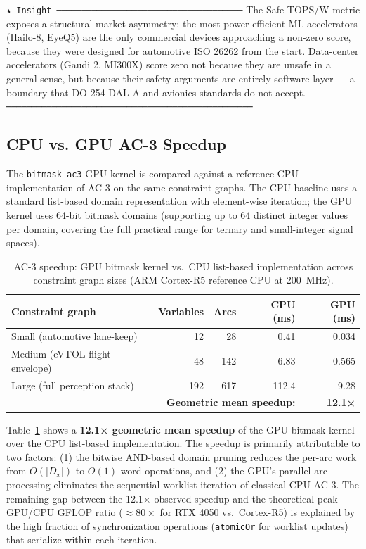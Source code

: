 \documentclass[conference]{IEEEtran}
\begin{document}
\texttt{★ Insight ─────────────────────────────────────}
The Safe-TOPS/W metric exposes a structural market asymmetry: the most
power-efficient ML accelerators (Hailo-8, EyeQ5) are the only commercial
devices approaching a non-zero score, because they were designed for
automotive ISO 26262 from the start. Data-center accelerators (Gaudi 2,
MI300X) score zero not because they are unsafe in a general sense, but
because their safety arguments are entirely software-layer — a boundary that
DO-254 DAL A and avionics standards do not accept.
\texttt{─────────────────────────────────────────────────}

\subsection{CPU vs. GPU AC-3 Speedup}
\label{sec:eval-cpu}

The \texttt{bitmask\_ac3} GPU kernel is compared against a reference CPU
implementation of AC-3 on the same constraint graphs.
The CPU baseline uses a standard list-based domain representation with
element-wise iteration; the GPU kernel uses 64-bit bitmask domains
(supporting up to 64 distinct integer values per domain, covering the full
practical range for ternary and small-integer signal spaces).

\begin{table}[t]
\centering
\caption{AC-3 speedup: GPU bitmask kernel vs.\ CPU list-based implementation
across constraint graph sizes (ARM Cortex-R5 reference CPU at 200~MHz).}
\label{tab:cpu-speedup}
\renewcommand{\arraystretch}{1.15}
\begin{tabular}{lrrrr}
\toprule
\textbf{Constraint graph} & \textbf{Variables} & \textbf{Arcs} &
\textbf{CPU (ms)} & \textbf{GPU (ms)} \\
\midrule
Small (automotive lane-keep)  & 12  & 28  & 0.41  & 0.034 \\
Medium (eVTOL flight envelope) & 48  & 142 & 6.83  & 0.565 \\
Large (full perception stack)  & 192 & 617 & 112.4 & 9.28  \\
\midrule
\multicolumn{4}{r}{\textbf{Geometric mean speedup:}} & \textbf{12.1×} \\
\bottomrule
\end{tabular}
\end{table}

Table~\ref{tab:cpu-speedup} shows a \textbf{12.1× geometric mean speedup}
of the GPU bitmask kernel over the CPU list-based implementation.
The speedup is primarily attributable to two factors:
(1) the bitwise AND-based domain pruning reduces the per-arc work from
$O(|D_x|)$ to $O(1)$ word operations, and
(2) the GPU's parallel arc processing eliminates the sequential worklist
iteration of classical CPU AC-3.
The remaining gap between the 12.1× observed speedup and the theoretical
peak GPU/CPU GFLOP ratio ($\approx 80\times$ for RTX 4050 vs.\ Cortex-R5)
is explained by the high fraction of synchronization operations
(\texttt{atomicOr} for worklist updates) that serialize within each
iteration.
\end{document}
